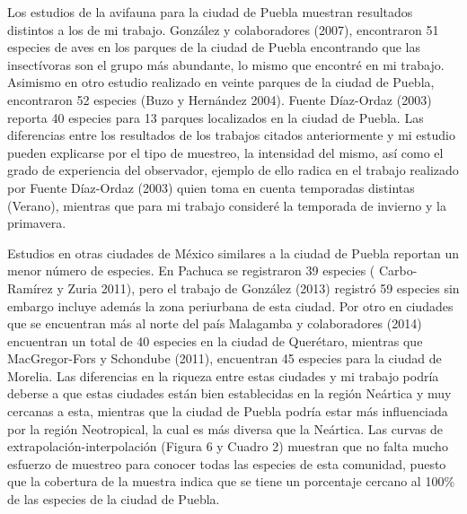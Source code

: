 \documentclass[letterpaper,12pt]{article}
\begin{document}
Los estudios de la avifauna para la ciudad de Puebla muestran resultados distintos a los de mi trabajo. González y colaboradores (2007), encontraron 51 especies de aves en los parques de la ciudad de Puebla encontrando que las insectívoras son el grupo más abundante, lo mismo que encontré en mi trabajo. Asimismo en otro estudio realizado en veinte parques de la ciudad de Puebla, encontraron 52 especies (Buzo y Hernández 2004). Fuente Díaz-Ordaz (2003) reporta 40 especies para 13 parques localizados en la ciudad de Puebla. Las diferencias entre los resultados de los trabajos citados anteriormente y mi estudio pueden explicarse por el tipo de muestreo, la intensidad del mismo, así como el grado de experiencia del observador, ejemplo de ello radica en el trabajo realizado por Fuente Díaz-Ordaz (2003) quien toma en cuenta temporadas distintas (Verano), mientras que para mi trabajo consideré la temporada de invierno y la primavera.

Estudios en otras ciudades de México similares a la ciudad de Puebla reportan un menor número de especies. En Pachuca se registraron 39 especies ( Carbo-Ramírez y Zuria 2011), pero el trabajo de González (2013) registró  59 especies sin embargo incluye además la zona periurbana de esta ciudad. Por otro en ciudades que se encuentran más al norte del país Malagamba y colaboradores (2014) encuentran un total de 40 especies en la ciudad de Querétaro, mientras que MacGregor-Fors y Schondube (2011), encuentran 45 especies para la ciudad de Morelia. Las diferencias en la riqueza entre estas ciudades y mi trabajo podría deberse a que estas ciudades están bien establecidas en la región Neártica y muy cercanas a esta, mientras que la ciudad de Puebla podría estar más influenciada por la región Neotropical, la cual es más diversa que la Neártica. 
Las curvas de extrapolación-interpolación (Figura 6 y Cuadro 2) muestran que no falta mucho esfuerzo de muestreo para conocer todas las especies de esta comunidad, puesto que la cobertura de la muestra indica que se tiene un porcentaje cercano al 100\% de las especies de la ciudad de Puebla.
\end{document}
